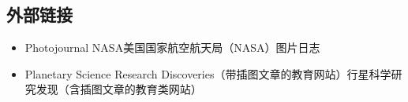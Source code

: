 \subsection{外部链接}
\begin{itemize}
\item Photojournal NASA美国国家航空航天局（NASA）图片日志
\item Planetary Science Research Discoveries（带插图文章的教育网站）行星科学研究发现（含插图文章的教育类网站）
\end{itemize}






